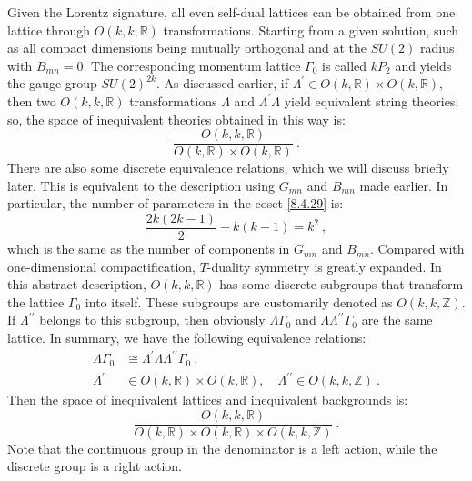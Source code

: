 Given the Lorentz signature, all even self-dual lattices can be obtained from one lattice through $O(k, k, \mathds{R})$ transformations. 
Starting from a given solution, such as all compact dimensions being mutually orthogonal and at the $S U(2)$ radius with $B_{m n}=0 $. The corresponding momentum lattice $\Gamma_{0}$ is called $k P_{2}$ and yields the gauge group $S U(2)^{2 k}$. 
As discussed earlier, if $\Lambda^{\prime} \in O(k, \mathds{R}) \times O(k, \mathds{R})$, 
then two $O(k, k, \mathds{R})$ transformations $\Lambda$ and $\Lambda^{\prime} \Lambda$ yield equivalent string theories; so, 
the space of inequivalent theories obtained in this way is:
\begin{equation}
	\frac{O(k, k, \mathds{R})}{O(k, \mathds{R}) \times O(k, \mathds{R})} \:. \label{8.4.29}
\end{equation}
There are also some discrete equivalence relations, which we will discuss briefly later. 
This is equivalent to the description using $G_{m n}$ and $B_{m n} $ made earlier. In particular, the number of parameters in the coset \eqref{8.4.29} is:
\begin{equation}
	\frac{2 k(2 k-1)}{2}-k(k-1)=k^{2} \:, \label{8.4.30}
\end{equation}
which is the same as the number of components in $G_{m n}$ and $B_{m n}$. 
Compared with one-dimensional compactification, $T$-duality symmetry is greatly expanded. In this abstract description, $O(k, k, \mathds{R})$ has some discrete subgroups that transform the lattice $\Gamma_{0}$ into itself. 
These subgroups are customarily denoted as $O(k, k, \mathds{Z})$. 
If $\Lambda^{\prime \prime}$ belongs to this subgroup, then obviously $\Lambda \Gamma_{0}$ and $\Lambda \Lambda^{\prime \prime} \Gamma_{0}$ are the same lattice. 
In summary, we have the following equivalence relations:
\begin{subequations} \label{8.4.31}
	\begin{align}
		\Lambda \Gamma_{0} &\cong \Lambda^{\prime} \Lambda \Lambda^{\prime \prime} \Gamma_{0} \:, \label{8.4.31a} \\
		\Lambda^{\prime} &\in O(k, \mathds{R}) \times O(k, \mathds{R}), \quad \Lambda^{\prime \prime} \in O(k, k, \mathds{Z} ) \:. \label{8.4.31b}
	\end{align}
\end{subequations}
Then the space of inequivalent lattices and inequivalent backgrounds is:
\begin{equation}
	\frac{O(k, k, \mathds{R})}{O(k, \mathds{R}) \times O(k, \mathds{R}) \times O(k, k, \mathds{Z})} \:. \label{8.4.32}
\end{equation}
Note that the continuous group in the denominator is a left action, while the discrete group is a right action. 

